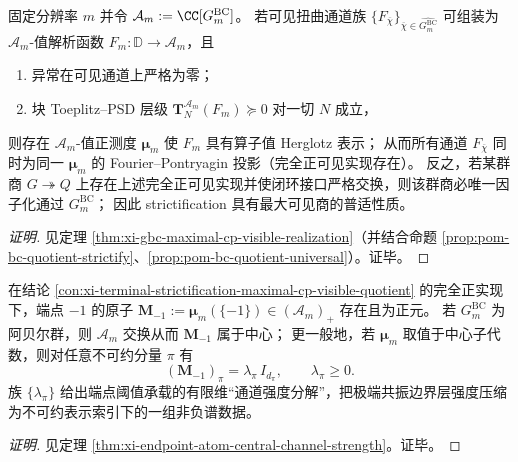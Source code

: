 \begin{conclusion}\label{con:xi-terminal-strictification-maximal-cp-visible-quotient}
固定分辨率 \(m\) 并令 \(\mathcal{A}_m:=\CC[G^{\mathrm{BC}}_m]\)。
若可见扭曲通道族 \(\{F_{\overline\chi}\}_{\overline\chi\in\widehat{G^{\mathrm{BC}}_m}}\) 可组装为 \(\mathcal{A}_m\)-值解析函数 \(F_m:\mathbb{D}\to\mathcal{A}_m\)，且
\begin{enumerate}
  \item 异常在可见通道上严格为零；
  \item 块 Toeplitz--PSD 层级 \(\mathbf{T}^{\mathcal{A}_m}_N(F_m)\succeq 0\) 对一切 \(N\) 成立，
\end{enumerate}
则存在 \(\mathcal{A}_m\)-值正测度 \(\boldsymbol\mu_m\) 使 \(F_m\) 具有算子值 Herglotz 表示；
从而所有通道 \(F_{\overline\chi}\) 同时为同一 \(\boldsymbol\mu_m\) 的 Fourier--Pontryagin 投影（完全正可见实现存在）。
反之，若某群商 \(G\twoheadrightarrow Q\) 上存在上述完全正可见实现并使闭环接口严格交换，则该群商必唯一因子化通过 \(G^{\mathrm{BC}}_m\)；
因此 strictification 具有最大可见商的普适性质。
\end{conclusion}
\begin{proof}[证明]
见定理 \ref{thm:xi-gbc-maximal-cp-visible-realization}（并结合命题 \ref{prop:pom-bc-quotient-strictify}、\ref{prop:pom-bc-quotient-universal}）。证毕。
\end{proof}




\begin{conclusion}\label{con:xi-terminal-endpoint-atom-channel-strength-spectrum}
在结论 \ref{con:xi-terminal-strictification-maximal-cp-visible-quotient} 的完全正实现下，端点 \(-1\) 的原子
\(
\mathbf{M}_{-1}:=\boldsymbol\mu_m(\{-1\})\in(\mathcal{A}_m)_+
\)
存在且为正元。
若 \(G^{\mathrm{BC}}_m\) 为阿贝尔群，则 \(\mathcal{A}_m\) 交换从而 \(\mathbf{M}_{-1}\) 属于中心；
更一般地，若 \(\boldsymbol\mu_m\) 取值于中心子代数，则对任意不可约分量 \(\pi\) 有
\[
(\mathbf{M}_{-1})_\pi=\lambda_\pi\,I_{d_\pi},
\qquad
\lambda_\pi\ge 0.
\]
族 \(\{\lambda_\pi\}\) 给出端点阈值承载的有限维“通道强度分解”，把极端共振边界层强度压缩为不可约表示索引下的一组非负谱数据。
\end{conclusion}
\begin{proof}[证明]
见定理 \ref{thm:xi-endpoint-atom-central-channel-strength}。证毕。
\end{proof}

